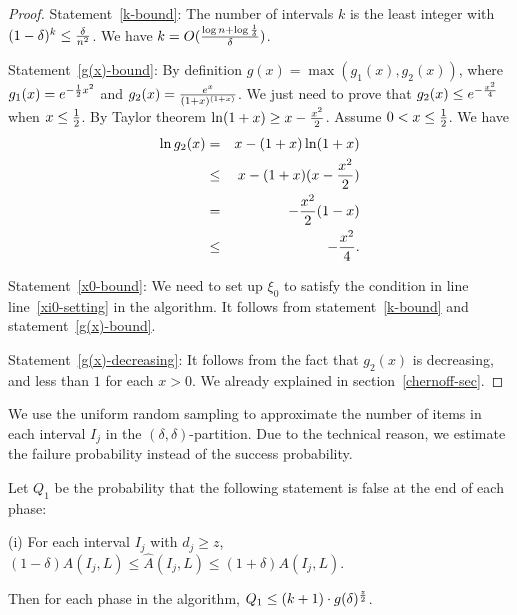 \documentclass[runningheads]{llncs}
\begin{document}
\begin{proof} Statement~\ref{k-bound}:
The number of intervals $k$ is the least integer with
$(1-\delta)^k\le {\delta\over n^2}$. We have $k= O({\log n+\log
{1\over \delta}\over \delta})$.

Statement~\ref{g(x)-bound}: By definition
$g(x)=\max(g_1(x),g_2(x))$, where $g_1(x)=e^{-{1\over 2}x^2}$ and
$g_2(x)={e^{x}\over (1+x)^{(1+x)}}$. We just need to prove that
$g_2(x)\le e^{-{x^2\over 4}}$ when $x\le {1\over 2}$. By Taylor
theorem $\ln (1+x)\ge x-{x^2\over 2}$. Assume $0<x\le {1\over 2}$.
We have
\begin{eqnarray*}
\ln g_2(x) &=&x-(1+x)\ln (1+x)\\
&\le&x-(1+x)(x-{x^2\over 2})\\
&=&-{x^2\over 2}(1-x)\\
&\le&-{x^2\over 4}.
\end{eqnarray*}

Statement~\ref{x0-bound}: We need to set up $\xi_0$ to satisfy the
condition in line line~\ref{xi0-setting} in the algorithm. It
follows from statement~\ref{k-bound} and statement~\ref{g(x)-bound}.

Statement~\ref{g(x)-decreasing}: It follows from the fact that
$g_2(x)$ is decreasing, and less than $1$ for each $x>0$. We already
 explained in section~\ref{chernoff-sec}.
\end{proof}





We use the uniform random sampling to approximate the  number of
items in each interval $I_j$ in the $(\delta,\delta)$-partition. Due
to the technical reason, we estimate the failure probability instead
of the success probability.


\begin{lemma}\label{lemma.1}
Let $Q_1$ be the probability that the following statement is false
at the end of each phase:

(i) For each interval $I_j$ with $d_j\ge z$, $(1-\delta)A(I_j,L)\le
\hat{A}(I_j,L)\le (1+\delta)A(I_j,L)$.

Then for each phase in the algorithm, $Q_1\le (k+1)\cdot
g(\delta)^{z\over 2}$.
\end{lemma}
\end{document}
